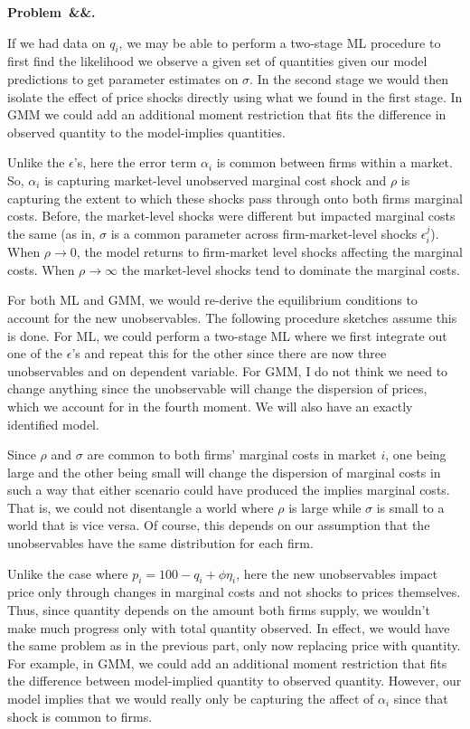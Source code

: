 \documentclass[12pt]{article}
\newcounter{problem}
\newenvironment{problem}[1][]{
    \newpage %
    \refstepcounter{problem}\par\noindent
    \textbf{Problem~\theproblem\ifx&#1&\else.~#1\fi}\rmfamily\par\vspace{0.5em}
}{\vspace{1em}}
\begin{document}
\begin{problem}
\begin{subproblems}
        If we had data on $q_i$, we may be able to perform a two-stage ML procedure to first find the likelihood we observe a given set of quantities given our model predictions to get parameter estimates on $\sigma$. In the second stage we would then isolate the effect of price shocks directly using what we found in the first stage. In GMM we could add an additional moment restriction that fits the difference in observed quantity to the model-implies quantities.
        
        \item Unlike the $\epsilon$'s, here the error term $\alpha_i$ is common between firms within a market. So, $\alpha_i$ is capturing market-level unobserved marginal cost shock and $\rho$ is capturing the extent to which these shocks pass through onto both firms marginal costs. Before, the market-level shocks were different but impacted marginal costs the same (as in, $\sigma$ is a common parameter across firm-market-level shocks $\epsilon_i^j$). When $\rho \to 0$, the model returns to firm-market level shocks affecting the marginal costs. When $\rho \to \infty$ the market-level shocks tend to dominate the marginal costs. 
        
        \item For both ML and GMM, we would re-derive the equilibrium conditions to account for the new unobservables. The following procedure sketches assume this is done. For ML, we could perform a two-stage ML where we first integrate out one of the $\epsilon$'s and repeat this for the other since there are now three unobservables and on dependent variable. For GMM, I do not think we need to change anything since the unobservable will change the dispersion of prices, which we account for in the fourth moment. We will also have an exactly identified model. 
        
        \item Since $\rho$ and $\sigma$ are common to both firms' marginal costs in market $i$, one being large and the other being small will change the dispersion of marginal costs in such a way that either scenario could have produced the implies marginal costs. That is, we could not disentangle a world where $\rho$ is large while $\sigma$ is small to a world that is vice versa. Of course, this depends on our assumption that the unobservables have the same distribution for each firm. 
        
        \item Unlike the case where $p_i = 100 - q_i + \phi \eta_i$, here the new unobservables impact price only through changes in marginal costs and not shocks to prices themselves. Thus, since quantity depends on the amount both firms supply, we wouldn't make much progress only with total quantity observed. In effect, we would have the same problem as in the previous part, only now replacing price with quantity. For example, in GMM, we could add an additional moment restriction that fits the difference between model-implied quantity to observed quantity. However, our model implies that we would really only be capturing the affect of $\alpha_i$ since that shock is common to firms. 
        

\end{subproblems}
\end{problem}
\end{document}
